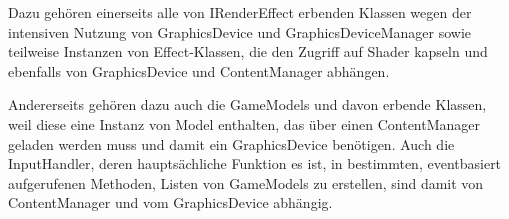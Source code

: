 Dazu gehören einerseits alle von IRenderEffect erbenden Klassen wegen der intensiven Nutzung von GraphicsDevice und GraphicsDeviceManager sowie teilweise Instanzen von Effect-Klassen, die den Zugriff auf Shader kapseln und ebenfalls von GraphicsDevice und ContentManager abhängen.

Andererseits gehören dazu auch die GameModels und davon erbende Klassen, weil diese eine Instanz von Model enthalten, das über einen ContentManager geladen werden muss und damit ein GraphicsDevice benötigen. Auch die InputHandler, deren hauptsächliche Funktion es ist, in bestimmten, eventbasiert aufgerufenen Methoden, Listen von GameModels zu erstellen, sind damit von ContentManager und vom GraphicsDevice abhängig.
~\\

















